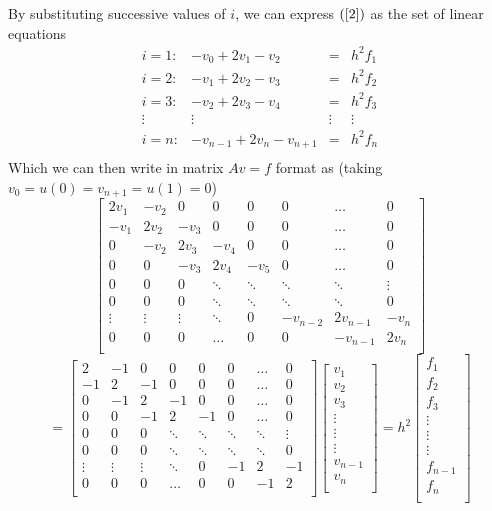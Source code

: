 \documentclass[a4paper, 12pt, twoside]{article}
\begin{document}
By substituting successive values of $i$, we can express $(\ref{2})$ as the set of linear equations
\begin{equation}
\label{3}
\begin{array}{cccc}
	i = 1:& -v_0+2v_1-v_2   &=&h^2f_1\\
	i = 2:& -v_1+2v_2-v_3 &=&h^2f_2\\
	i = 3:& -v_2+2v_3-v_4 &=&h^2f_3\\
	\vdots&\vdots&\vdots&\vdots\\
	i = n:& -v_{n-1} + 2v_n - v_{n+1} &=&h^2f_n\\
\end{array}
\end{equation}
Which we can then write in matrix $Av = f$ format as
(taking $v_0 = u(0) = v_{n+1} = u(1) = 0$)
	\[
	\begin{bmatrix}
	2v_1 &-v_2  & 0   &0&0&0 &\dots &0\\
	-v_1 & 2v_2 &-v_3 & 0 & 0  & 0 &\dots &0\\
	0 &-v_2  & 2v_3 &-v_4 & 0 & 0 &\dots &0 \\
	0 & 0 & -v_3 & 2v_4 &-v_5 & 0 &\dots &0\\
	0&0&0&\ddots&\ddots&\ddots&\ddots&\vdots\\
	0&0&0&\ddots&\ddots&\ddots&\ddots&0\\
	\vdots&\vdots&\vdots&\ddots&0&-v_{n-2}&2v_{n-1}&-v_n\\
	0&0&0&\dots&0&0&-v_{n-1}&2v_n\\
	\end{bmatrix}
	\]
	\[
	=
	\begin{bmatrix}
	2 &-1  & 0   &0&0&0 &\dots &0\\
	-1 & 2 &-1 & 0 & 0  & 0 &\dots &0\\
	0 &-1  & 2 &-1 & 0 & 0 &\dots &0 \\
	0 & 0 & -1 & 2 &-1 & 0 &\dots &0\\
	0&0&0&\ddots&\ddots&\ddots&\ddots&\vdots\\
	0&0&0&\ddots&\ddots&\ddots&\ddots&0\\
	\vdots&\vdots&\vdots&\ddots&0&-1&2&-1\\
	0&0&0&\dots&0&0&-1&2\\
	\end{bmatrix}
	\begin{bmatrix}
	v_1\\
	v_2\\
	v_3\\
	\vdots\\
	\vdots\\
	\vdots\\
	v_{n-1}\\
	v_n\\
	\end{bmatrix}
	=h^2
	\begin{bmatrix}
	f_1\\
	f_2\\
	f_3\\
	\vdots\\
	\vdots\\
	\vdots\\
	f_{n-1}\\
	f_n\\
	\end{bmatrix}
	\]
\end{document}
